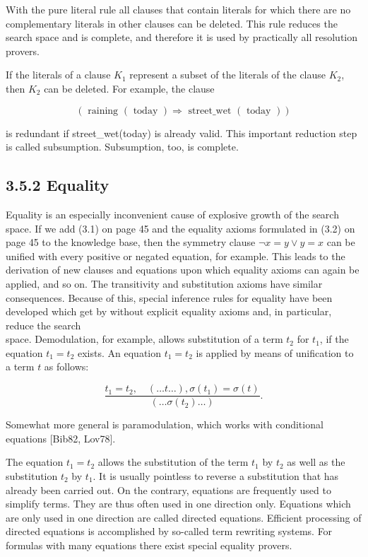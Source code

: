 \documentclass[10pt]{article}
\begin{document}
With the pure literal rule all clauses that contain literals for which there are no complementary literals in other clauses can be deleted. This rule reduces the search space and is complete, and therefore it is used by practically all resolution provers.

If the literals of a clause $K_{1}$ represent a subset of the literals of the clause $K_{2}$, then $K_{2}$ can be deleted. For example, the clause

$$
(\text { raining }(\text { today }) \Rightarrow \text { street_wet }(\text { today }))
$$

is redundant if street\_wet(today) is already valid. This important reduction step is called subsumption. Subsumption, too, is complete.

\subsection*{3.5.2 Equality}
Equality is an especially inconvenient cause of explosive growth of the search space. If we add (3.1) on page 45 and the equality axioms formulated in (3.2) on page 45 to the knowledge base, then the symmetry clause $\neg x=y \vee y=x$ can be unified with every positive or negated equation, for example. This leads to the derivation of new clauses and equations upon which equality axioms can again be applied, and so on. The transitivity and substitution axioms have similar consequences. Because of this, special inference rules for equality have been developed which get by without explicit equality axioms and, in particular, reduce the search\\
space. Demodulation, for example, allows substitution of a term $t_{2}$ for $t_{1}$, if the equation $t_{1}=t_{2}$ exists. An equation $t_{1}=t_{2}$ is applied by means of unification to a term $t$ as follows:

$$
\frac{t_{1}=t_{2}, \quad(\ldots t \ldots), \sigma\left(t_{1}\right)=\sigma(t)}{\left(\ldots \sigma\left(t_{2}\right) \ldots\right)} .
$$

Somewhat more general is paramodulation, which works with conditional equations [Bib82, Lov78].

The equation $t_{1}=t_{2}$ allows the substitution of the term $t_{1}$ by $t_{2}$ as well as the substitution $t_{2}$ by $t_{1}$. It is usually pointless to reverse a substitution that has already been carried out. On the contrary, equations are frequently used to simplify terms. They are thus often used in one direction only. Equations which are only used in one direction are called directed equations. Efficient processing of directed equations is accomplished by so-called term rewriting systems. For formulas with many equations there exist special equality provers.
\end{document}
